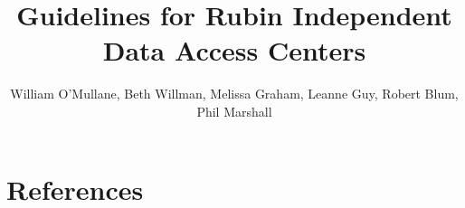 \documentclass[DM,authoryear,toc]{lsstdoc}
\title[Independent DACs]{Guidelines for Rubin Independent Data Access Centers}
\author   {William O'Mullane, Beth Willman, Melissa Graham, Leanne Guy, Robert Blum, Phil Marshall }
\date{\vcsDate}
\begin{document}
\maketitle

\renewcommand{\thepage}{\arabic{page}}%

\setcounter{page}{1}%



%





\appendix
\section{References} \label{sec:bib}
\renewcommand{\refname}{} %


%

\printglossaries \label{sec:acronyms}



\end{document}
